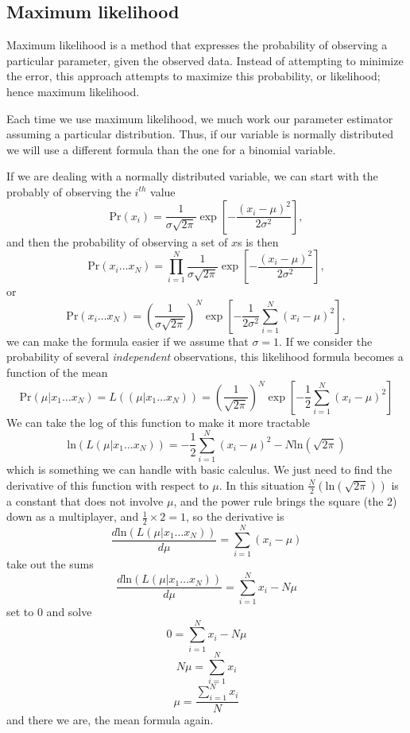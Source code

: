 \subsection{Maximum likelihood}
\label{sec:mimean}

Maximum likelihood is a method that expresses the probability of observing a particular parameter, given the observed data. Instead of attempting to minimize the error, this approach attempts to maximize this probability, or likelihood; hence maximum likelihood.

Each time we use maximum likelihood, we much work our parameter estimator assuming a particular distribution. Thus, if our variable is normally distributed we will use a different formula than the one for a binomial variable.

If we are dealing with a normally distributed variable, we can start with the probably of observing the $i^{th}$ value
\begin{equation}
\mbox{Pr}\left(x_i\right)=\frac{1}{\sigma\sqrt{2\pi}}\exp\left[-\frac{\left(x_i-\mu\right)^2}{2\sigma^2}\right],
\end{equation}
and then the probability of observing a set of $x$s is then
\begin{equation}
\mbox{Pr}\left(x_i\ldots x_N\right)=\prod_{i=1}^N\frac{1}{\sigma\sqrt{2\pi}}\exp\left[-\frac{\left(x_i-\mu\right)^2}{2\sigma^2}\right],
\end{equation}
or
\begin{equation}
\mbox{Pr}\left(x_i\ldots x_N\right)=\left(\frac{1}{\sigma\sqrt{2\pi}}\right)^N\exp\left[-\frac{1}{2\sigma^2}\sum_{i=1}^N\left(x_i-\mu\right)^2\right],
\end{equation}
we can make the formula easier if we assume that $\sigma= 1$. If we consider the probability of several {\it independent} observations, this likelihood formula becomes a function of the mean
\begin{equation}
\mbox{Pr}\left(\mu\vert x_1\ldots x_N\right)=L\left(\left(\mu\vert x_1\ldots x_N\right)\right)=\left(\frac{1}{\sqrt{2\pi}}\right)^N\exp\left[-\frac{1}{2}\sum_{i=1}^N\left(x_i-\mu\right)^2\right]
\end{equation}
We can take the log of this function to make it more tractable
\begin{equation}
\mbox{ln}\left(L\left(\mu\vert x_1\ldots x_N\right)\right)=-\frac{1}{2}\sum_{i=1}^N\left(x_i-\mu\right)^2-N\mbox{ln}\left(\sqrt{2\pi}\right)
\end{equation}
which is something we can handle with basic calculus. We just need to find the derivative of this function with respect to $\mu$. In this situation $\frac{N}{2}\left(\mbox{ln}\left(\sqrt{2\pi}\right)\right)$ is a constant that does not involve $\mu$, and the power rule brings the square (the 2) down as a multiplayer, and $\frac{1}{2}\times 2 = 1$, so the derivative is
\[
\frac{d\mbox{ln}\left(L\left(\mu\vert x_1\ldots x_N\right)\right)}{d\mu}=\sum_{i=1}^N\left(x_i-\mu\right)
\]
take out the sums
\[
\frac{d\mbox{ln}\left(L\left(\mu\vert x_1\ldots x_N\right)\right)}{d\mu}=\sum_{i=1}^Nx_i-N\mu
\]
set to 0 and solve
\[
0=\sum_{i=1}^Nx_i-N\mu
\]
\[
N\mu=\sum_{i=1}^Nx_i
\]
\[
\mu=\frac{\sum_{i=1}^Nx_i}{N}
\]
and there we are, the mean formula again.

